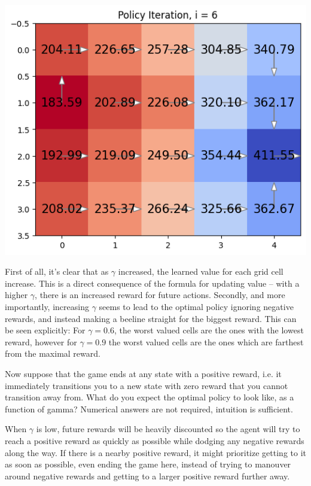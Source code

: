 \documentclass[expanded]{lkx_pset}
\begin{document}
\begin{solution}
\begin{center}
		\includegraphics[scale=0.5]{figures/4-4.png}
	\end{center}
	First of all, it's clear that as $\gamma$ increased, the learned value for each grid cell increase. This is a direct consequence of the formula for updating value -- with a higher $\gamma$, there is an increased reward for future actions. Secondly, and more importantly, increasing $\gamma$ seems to lead to the optimal policy ignoring negative rewards, and instead making a beeline straight for the biggest reward. This can be seen explicitly: For $\gamma=0.6$, the worst valued cells are the ones with the lowest reward, however for $\gamma=0.9$ the worst valued cells are the ones which are farthest from the maximal reward.

	\begin{part}{5} Now suppose that the game ends at any state with a positive reward, i.e. it immediately transitions you to a new state with zero reward that you cannot transition away from. What do you expect the optimal policy to look like, as a function of gamma? Numerical answers are not required, intuition is sufficient.
	\end{part}

	When $\gamma$ is low, future rewards will be heavily discounted so the agent will try to reach a positive reward as quickly as possible while dodging any negative rewards along the way. If there is a nearby positive reward, it might prioritize getting to it as soon as possible, even ending the game here, instead of trying to manouver around negative rewards and getting to a larger positive reward further away.


\end{solution}
\end{document}
